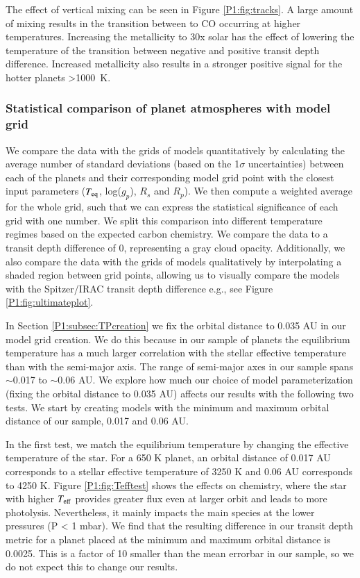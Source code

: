 The effect of vertical mixing can be seen in Figure \ref{P1:fig:tracks}. A large amount of mixing results in the transition between  to CO occurring at higher temperatures. Increasing the metallicity to 30x solar has the effect of lowering the temperature of the transition between negative and positive transit depth difference. Increased metallicity also results in a stronger positive signal for the hotter planets >1000~K.

\subsubsection{Statistical comparison of planet atmospheres with model grid}
\label{P1:sec:gridstats}

We compare the data with the grids of models quantitatively by calculating the average number of standard deviations (based on the 1$\sigma$ uncertainties) between each of the planets and their corresponding model grid point with the closest input parameters ($T_{\rm eq}$, log($g_p$), $R_s$ and $R_p$). We then compute a weighted average for the whole grid, such that we can express the statistical significance of each grid with one number. We split this comparison into different temperature regimes based on the expected carbon chemistry. We compare the data to a transit depth difference of 0, representing a gray cloud opacity. Additionally, we also compare the data with the grids of models qualitatively by interpolating a shaded region between grid points, allowing us to visually compare the models with the Spitzer/IRAC transit depth difference e.g., see Figure \ref{P1:fig:ultimateplot}.

In Section \ref{P1:subsec:TPcreation} we fix the orbital distance to 0.035 AU in our model grid creation. We do this because in our sample of planets the equilibrium temperature has a much larger correlation with the stellar effective temperature than with the semi-major axis. The range of semi-major axes in our sample spans $\sim$0.017 to $\sim$0.06 AU. We explore how much our choice of model parameterization (fixing the orbital distance to 0.035 AU) affects our results with the following two tests. We start by creating models with the minimum and maximum orbital distance of our sample, 0.017 and 0.06 AU.

In the first test, we match the equilibrium temperature by changing the effective temperature of the star. For a 650 K planet, an orbital distance of 0.017 AU corresponds to a stellar effective temperature of 3250 K and 0.06 AU corresponds to 4250 K. Figure \ref{P1:fig:Tefftest} shows the effects on chemistry, where the star with higher $T_{\rm eff}$ provides greater flux even at larger orbit and leads to more photolysis. Nevertheless, it mainly impacts the main species at the lower pressures (P < 1 mbar). We find that the resulting difference in our transit depth metric for a planet placed at the minimum and maximum orbital distance is 0.0025. This is a factor of 10 smaller than the mean errorbar in our sample, so we do not expect this to change our results.

